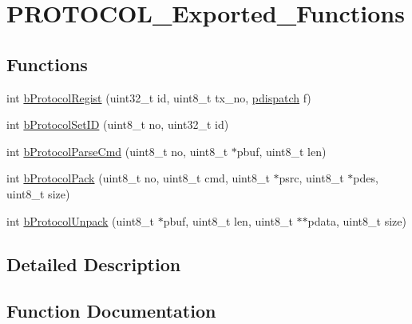 \hypertarget{group___p_r_o_t_o_c_o_l___exported___functions}{}\section{P\+R\+O\+T\+O\+C\+O\+L\+\_\+\+Exported\+\_\+\+Functions}
\label{group___p_r_o_t_o_c_o_l___exported___functions}
\subsection*{Functions}
\begin{DoxyCompactItemize}
\item 
int \mbox{\hyperlink{group___p_r_o_t_o_c_o_l___exported___functions_ga042c82b5764c60b4078866635c8e8c7b}{b\+Protocol\+Regist}} (uint32\+\_\+t id, uint8\+\_\+t tx\+\_\+no, \mbox{\hyperlink{group___p_r_o_t_o_c_o_l___exported___types_definitions_ga385520b45d23dc3a4dde23de92b85c75}{pdispatch}} f)
\item 
int \mbox{\hyperlink{group___p_r_o_t_o_c_o_l___exported___functions_gad6c6f38682c0c8cbb0ee45157b4f0490}{b\+Protocol\+Set\+ID}} (uint8\+\_\+t no, uint32\+\_\+t id)
\item 
int \mbox{\hyperlink{group___p_r_o_t_o_c_o_l___exported___functions_gaf49260c718f607cd54064c27a7980d66}{b\+Protocol\+Parse\+Cmd}} (uint8\+\_\+t no, uint8\+\_\+t $\ast$pbuf, uint8\+\_\+t len)
\item 
int \mbox{\hyperlink{group___p_r_o_t_o_c_o_l___exported___functions_gaad449710b7f804997e815402951fa0de}{b\+Protocol\+Pack}} (uint8\+\_\+t no, uint8\+\_\+t cmd, uint8\+\_\+t $\ast$psrc, uint8\+\_\+t $\ast$pdes, uint8\+\_\+t size)
\item 
int \mbox{\hyperlink{group___p_r_o_t_o_c_o_l___exported___functions_gaa2f6a6a163f48963d802b9f6964f348c}{b\+Protocol\+Unpack}} (uint8\+\_\+t $\ast$pbuf, uint8\+\_\+t len, uint8\+\_\+t $\ast$$\ast$pdata, uint8\+\_\+t size)
\end{DoxyCompactItemize}


\subsection{Detailed Description}


\subsection{Function Documentation}
\mbox{\label{group___p_r_o_t_o_c_o_l___exported___functions_gaad449710b7f804997e815402951fa0de}} 
